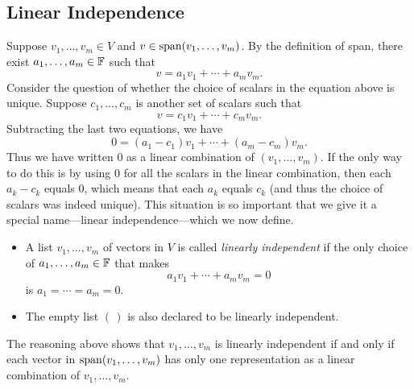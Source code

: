 \subsection{Linear Independence}

Suppose $v_1,\dots,v_m\in V$ and $v\in\operatorname{span}(v_1,\dots,v_m)$. By the definition
of span, there exist $a_1,\dots,a_m\in\mathbb{F}$ such that
\[ v = a_1v_1+\cdots+a_mv_m. \]
Consider the question of whether the choice of scalars in the equation above is
unique. Suppose $c_1,\dots,c_m$ is another set of scalars such that
\[ v = c_1v_1+\cdots+c_mv_m. \]
Subtracting the last two equations, we have
\[ 0 = (a_1-c_1)v_1+\cdots+(a_m-c_m)v_m. \]
Thus we have written $0$ as a linear combination of $(v_1,\dots,v_m)$. If the
only way to do this is by using $0$ for all the scalars in the linear
combination, then each $a_k-c_k$ equals $0$, which means that each $a_k$ equals
$c_k$ (and thus the choice of scalars was indeed unique). This situation is so
important that we give it a special name---linear independence---which we now
define.

\begin{definition}\label{ax:2.15}\leavevmode
\begin{itemize}
\item A list $v_1,\dots,v_m$ of vectors in $V$ is called \emph{linearly
  independent} if the only choice of $a_1,\dots,a_m\in\mathbb{F}$ that makes
  \[ a_1v_1+\cdots+a_mv_m = 0 \]
  is $a_1=\cdots=a_m=0$.
\item The empty list $(\,)$ is also declared to be linearly independent.
\end{itemize}
\end{definition}

The reasoning above shows that $v_1,\dots,v_m$ is linearly independent if and
only if each vector in $\operatorname{span}(v_1,\dots,v_m)$ has only one representation as a
linear combination of $v_1,\dots,v_m$.


